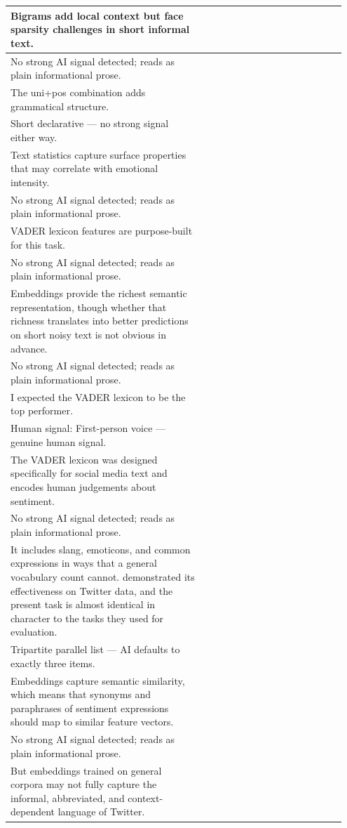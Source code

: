 \documentclass[11pt]{article}
\begin{document}
\begin{longtable}{|p{0.55\linewidth}|p{0.40\linewidth}|}
\hline
Bigrams add local context but face sparsity challenges in short informal text. & \\[2pt]
\hline
No strong AI signal detected; reads as plain informational prose. & \\
\hline
The uni+pos combination adds grammatical structure. & \\[2pt]
\hline
Short declarative --- no strong signal either way. & \\
\hline
Text statistics capture surface properties that may correlate with emotional intensity. & \\[2pt]
\hline
No strong AI signal detected; reads as plain informational prose. & \\
\hline
VADER lexicon features are purpose-built for this task. & \\[2pt]
\hline
No strong AI signal detected; reads as plain informational prose. & \\
\hline
Embeddings provide the richest semantic representation, though whether that richness translates into better predictions on short noisy text is not obvious in advance. & \\[2pt]
\hline
No strong AI signal detected; reads as plain informational prose. & \\
\hline
I expected the VADER lexicon to be the top performer. & \\[2pt]
\hline
Human signal: First-person voice --- genuine human signal. & \\
\hline
The VADER lexicon was designed specifically for social media text and encodes human judgements about sentiment. & \\[2pt]
\hline
No strong AI signal detected; reads as plain informational prose. & \\
\hline
It includes slang, emoticons, and common expressions in ways that a general vocabulary count cannot. demonstrated its effectiveness on Twitter data, and the present task is almost identical in character to the tasks they used for evaluation. & \\[2pt]
\hline
Tripartite parallel list --- AI defaults to exactly three items. & \\
\hline
Embeddings capture semantic similarity, which means that synonyms and paraphrases of sentiment expressions should map to similar feature vectors. & \\[2pt]
\hline
No strong AI signal detected; reads as plain informational prose. & \\
\hline
But embeddings trained on general corpora may not fully capture the informal, abbreviated, and context-dependent language of Twitter. & \\[2pt]

\end{longtable}
\end{document}
